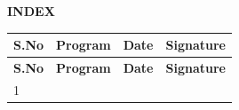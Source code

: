 \clearpage
{}

\begin{center}

{\Huge \textbf{INDEX}}
\vspace{0.5cm}

\renewcommand{\arraystretch}{1.5}
\begin{longtable}{|>{\centering\arraybackslash}p{1.5cm}|>{\centering\arraybackslash}p{9cm}|>{\centering\arraybackslash}p{2cm}|>{\centering\arraybackslash}p{2.5cm}|}
\hline
\textbf{S.No} & \textbf{Program} & \textbf{Date} & \textbf{Signature} \\
\hline
\endfirsthead

\hline
\textbf{S.No} & \textbf{Program} & \textbf{Date} & \textbf{Signature} \\
\hline
\endhead

1 & & & \\ \hline

\end{longtable}
\end{center}

\clearpage
{}
